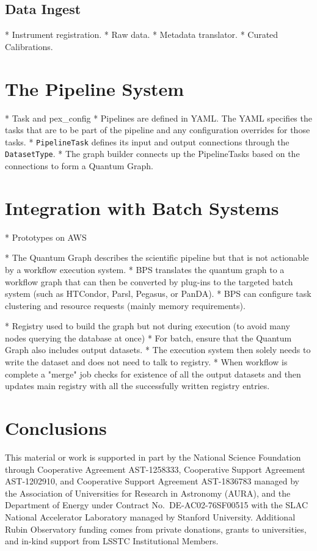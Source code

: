 \documentclass[]{spie}
\begin{document}
\subsection{Data Ingest}

* Instrument registration.
* Raw data.
* Metadata translator.
* Curated Calibrations.

\section{The Pipeline System}

* Task and pex\_config
* Pipelines are defined in YAML. The YAML specifies the tasks that are to be part of the pipeline and any configuration overrides for those tasks.
* \texttt{PipelineTask} defines its input and output connections through the \texttt{DatasetType}.
* The graph builder connects up the PipelineTasks based on the connections to form a Quantum Graph.

\section{Integration with Batch Systems}

* Prototypes on AWS \cite{2020arXiv201106044B}

* The Quantum Graph describes the scientific pipeline but that is not actionable by a workflow execution system.
* BPS translates the quantum graph to a workflow graph that can then be converted by plug-ins to the targeted batch system (such as HTCondor, Parsl, Pegasus, or PanDA).
* BPS can configure task clustering and resource requests (mainly memory requirements).

* Registry used to build the graph but not during execution (to avoid many nodes querying the database at once)
* For batch, ensure that the Quantum Graph also includes output datasets.
* The execution system then solely needs to write the dataset and does not need to talk to registry.
* When workflow is complete a "merge" job checks for existence of all the output datasets and then updates main registry with all the successfully written registry entries.

\section{Conclusions}

\acknowledgments

This material or work is supported in part by the National Science Foundation through Cooperative Agreement AST-1258333, Cooperative Support Agreement AST-1202910, and Cooperative Support Agreement AST-1836783 managed by the Association of Universities for Research in Astronomy (AURA), and the Department of Energy under Contract No.\ DE-AC02-76SF00515 with the SLAC National Accelerator Laboratory managed by Stanford University.
Additional Rubin Observatory funding comes from private donations, grants to universities, and in-kind support from LSSTC Institutional Members.



\end{document}
